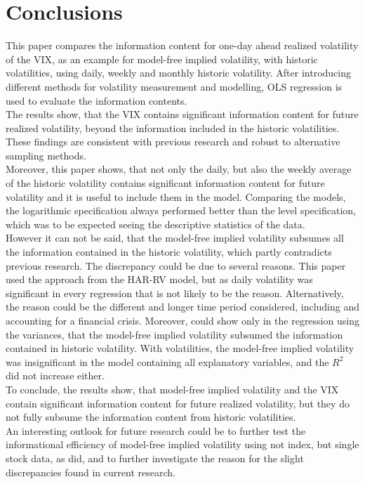 
\section{Conclusions}
This paper compares the information content for one-day ahead realized volatility of the \ac{VIX}, as an example for model-free implied volatility, with historic volatilities, using daily, weekly and monthly historic volatility. After introducing different methods for volatility measurement and modelling, OLS regression is used to evaluate the information contents. \\
The results show, that the \ac{VIX} contains significant information content for future realized volatility, beyond the information included in the historic volatilities. These findings are consistent with previous research and robust to alternative sampling methods. \\
Moreover, this paper shows, that not only the daily, but also the weekly average of the  historic volatility contains significant information content for future volatility and it is useful to include them in the model. Comparing the models, the logarithmic specification always performed better than the level specification, which was to be expected seeing the descriptive statistics of the data. \\
However it can not be said, that the model-free implied volatility subsumes all the information contained in the historic volatility, which partly contradicts previous research. The discrepancy could be due to several reasons. This paper used the approach from the HAR-RV model, but as daily volatility was significant in every regression that is not likely to be the reason. Alternatively, the reason could be the different and longer time period considered, including and accounting for a financial crisis. Moreover, \textcite{jiang2003} could show only in the regression using the variances, that the model-free implied volatility subsumed the information contained in historic volatility. With volatilities, the model-free implied volatility was insignificant in the model containing all explanatory variables, and the $R^{2}$ did not increase either.\\
To conclude, the results show, that model-free implied volatility and the VIX contain significant information content for future realized volatility, but they do not fully subsume the information content from historic volatilities.\\
An interesting outlook for future research could be to further test the informational efficiency of model-free implied volatility using not index, but single stock data, as \textcite{taylor2010} did, and to further investigate the reason for the slight discrepancies found in current research.

